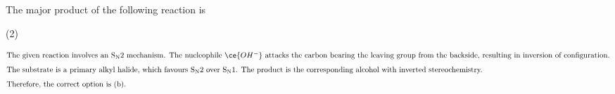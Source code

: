 
\item The major product of the following reaction is

\begin{center}
    
\end{center}

\begin{tasks}(2)
    \task \OptionA
    \task \OptionB \ans
    \task \OptionC
    \task \OptionD
\end{tasks}

\begin{solution}
\begin{align*}
\intertext{The given reaction involves an $\mathrm{S_N2}$ mechanism. The nucleophile $\ce{OH^-}$ attacks the carbon bearing the leaving group from the backside, resulting in inversion of configuration.}
\intertext{The substrate is a primary alkyl halide, which favours $\mathrm{S_N2}$ over $\mathrm{S_N1}$. The product is the corresponding alcohol with inverted stereochemistry.}
\intertext{Therefore, the correct option is (b).}
\end{align*}
\end{solution}
